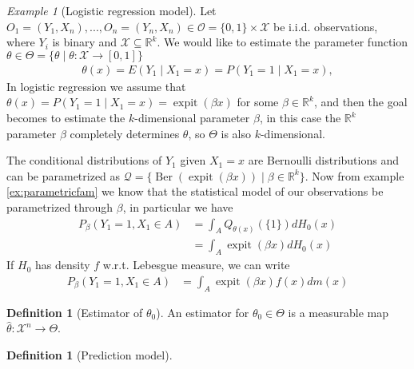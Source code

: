 \documentclass[11pt, a4paper]{article}
\theoremstyle{definition}
\newtheorem{definition}[theorem]{Definition}
\theoremstyle{remark}
\newtheorem{example}{Example}
\begin{document}
\begin{example}[Logistic regression model]
    Let $ O_1 = (Y_1 , X_n) , ..., O_n = (Y_n , X_n) \in \mathcal{O} = \{0,1\} \times \mathcal{X} $ be i.i.d. observations, where $ Y_i $ is binary and $ \mathcal{X} \subseteq \mathbb{R}^{k} $. We would like to estimate the parameter function $ \theta \in \Theta = \{\theta \mid \theta : \mathcal{X} \to [0,1]\} $
\begin{align*}
    \theta(x) = E(Y_1 \mid X_1 = x) = P(Y_1 = 1 \mid X_1 = x),
\end{align*}
In logistic regression we assume that $ \theta(x) = P(Y_1 = 1 \mid X_1 = x) = \operatorname{expit}(\beta x)  $  for some $ \beta \in \mathbb{R}^{k} $, and then the goal becomes to estimate the $ k $-dimensional parameter $ \beta $, in this case the $ \mathbb{R}^{k} $ parameter $ \beta  $ completely determines $ \theta $, so $ \Theta $ is also $ k $-dimensional. 

The conditional distributions of $ Y_1 $ given $ X_1 = x $ are Bernoulli distributions and can be parametrized as $ \mathcal{Q} = \{\operatorname{Ber}(\operatorname{expit}(\beta x )) \mid \beta \in \mathbb{R}^{k}  \}  $. Now from example \ref{ex:parametricfam} we know that the statistical model of our observations be parametrized through $ \beta $, in particular we have 
\begin{align*}
    P_{\beta}(Y_1= 1 , X_1 \in A) &= \int_{A} Q_{\theta(x)}(\{1\}) dH_{0}(x)\\
 &= \int_{A} \operatorname{expit}(\beta x )  d H_0(x) 
\end{align*}
If $ H_{0} $ has density $ f $ w.r.t. Lebesgue measure, we can write
\begin{align*}
    P_{\beta}(Y_1= 1 , X_1 \in A) &= \int_{A} \operatorname{expit}(\beta x ) f(x)  d m(x) 
\end{align*}

\end{example}

\begin{definition}[Estimator of $ \theta_0 $]
    An estimator for $ \theta_0 \in \Theta $ is a measurable map $ \hat{\theta} : \mathcal{X}^{n} \to \Theta  $.
\end{definition}

\begin{definition}[Prediction model]
\end{definition}
\end{document}
